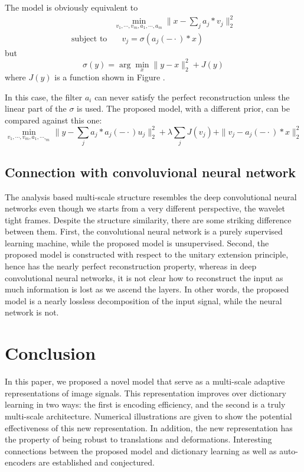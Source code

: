 \documentclass[a4paper]{article}
\begin{document}
{The model is obviously equivalent to 
\begin{equation}
	\begin{aligned}
		&\min_{v_1,\cdots,v_m,a_1,\cdots,a_m} \|x-\sum_j a_j*v_j\|_2^2  \\
		\textrm{subject to} & \quad v_j =\sigma(a_j(-\cdot)*x)
	\end{aligned}
\end{equation}
but 
\[
	\sigma(y)=\arg\min_x \|y-x\|_2^2 + J(y)
\]
where $J(y)$ is a function shown in Figure .

In this case, the filter $a_i$ can never satisfy the perfect reconstruction unless the linear part of the $\sigma$ is used. The proposed model, with a different prior, can be compared against this one:
\begin{equation}
	\min_{v_1,\cdots,v_m,a_1,\cdots,_m} \|y-\sum_j a_j*a_j(-\cdot)u_j\|_2^2 + \lambda \sum_j J(v_j)+\|v_j-a_j(-\cdot)*x\|_2^2
\end{equation}

\subsection{Connection with convoluvional neural network}
The analysis based multi-scale structure resembles the deep convolutional neural networks even though we starts from a very different perspective, the wavelet tight frames. Despite the structure similarity, there are some striking difference between them. First, the convolutional neural network is a purely supervised learning machine, while the proposed model is unsupervised. Second, the proposed model is constructed with respect to the unitary extension principle, hence has the nearly perfect reconstruction property, whereas in deep convolutional neural networks, it is not clear how to reconstruct the input as much information is lost as we ascend the layers. In other words, the proposed model is a nearly lossless decomposition of the input signal, while the neural network is not.
}








\newpage
\section{Conclusion}
In this paper, we proposed a novel model that serve as a multi-scale adaptive representations of image signals. This representation improves over dictionary learning in two ways: the first is encoding efficiency, and the second is a truly multi-scale architecture. Numerical illustrations are given to show the potential effectiveness of this new representation. In addition, the new representation has the property of being robust to translations and deformations. Interesting connections between the proposed model and dictionary learning as well as auto-encoders are established and conjectured. 
\end{document}
